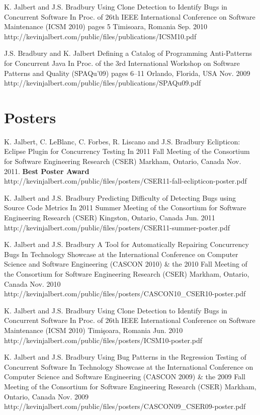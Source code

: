   \publicationEntry
    {K. Jalbert and J.S. Bradbury}
    {Using Clone Detection to Identify Bugs in Concurrent Software}
    {In Proc. of 26th IEEE International Conference on Software Maintenance (ICSM 2010)}
    {pages 5}
    {Timisoara, Romania}
    {Sep. 2010}
    {http://kevinjalbert.com/public/files/publications/ICSM10.pdf}

  \publicationEntry
    {J.S. Bradbury and K. Jalbert}
    {Defining a Catalog of Programming Anti-Patterns for Concurrent Java}
    {In Proc. of the 3rd International Workshop on Software Patterns and Quality (SPAQu'09)}
    {pages 6--11}
    {Orlando, Florida, USA}
    {Nov. 2009}
    {http://kevinjalbert.com/public/files/publications/SPAQu09.pdf}

  \section{Posters}

  \posterEntry
    {K. Jalbert, C. LeBlanc, C. Forbes, R. Liscano and J.S. Bradbury}
    {Eclipticon: Eclipse Plugin for Concurrency Testing}
    {In 2011 Fall Meeting of the Consortium for Software Engineering Research (CSER)}
    {Markham, Ontario, Canada}
    {Nov. 2011. \textbf{Best Poster Award}}
    {http://kevinjalbert.com/public/files/posters/CSER11-fall-eclipticon-poster.pdf}

  \posterEntry
    {K. Jalbert and J.S. Bradbury}
    {Predicting Difficulty of Detecting Bugs using Source Code Metrics}
    {In 2011 Summer Meeting of the Consortium for Software Engineering Research (CSER)}
    {Kingston, Ontario, Canada}
    {Jun. 2011}
    {http://kevinjalbert.com/public/files/posters/CSER11-summer-poster.pdf}

  \posterEntry
    {K. Jalbert and J.S. Bradbury}
    {A Tool for Automatically Repairing Concurrency Bugs}
    {In Technology Showcase at the International Conference on Computer Science and Software Engineering (CASCON 2010) \& the 2010 Fall Meeting of the Consortium for Software Engineering Research (CSER)}
    {Markham, Ontario, Canada}
    {Nov. 2010}
    {http://kevinjalbert.com/public/files/posters/CASCON10_CSER10-poster.pdf}

  \posterEntry
    {K. Jalbert and J.S. Bradbury}
    {Using Clone Detection to Identify Bugs in Concurrent Software}
    {In Proc. of 26th IEEE International Conference on Software Maintenance (ICSM 2010)}
    {Timi\c{s}oara, Romania}
    {Jun. 2010}
    {http://kevinjalbert.com/public/files/posters/ICSM10-poster.pdf}

  \posterEntry
    {K. Jalbert and J.S. Bradbury}
    {Using Bug Patterns in the Regression Testing of Concurrent Software}
    {In Technology Showcase at the International Conference on Computer Science and Software Engineering (CASCON 2009) \& the 2009 Fall Meeting of the Consortium for Software Engineering Research (CSER)}
    {Markham, Ontario, Canada}
    {Nov. 2009}
    {http://kevinjalbert.com/public/files/posters/CASCON09_CSER09-poster.pdf}



